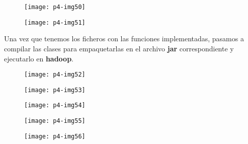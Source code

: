 \documentclass[10pt]{article}
\begin{document}
\begin{figure}[H]
	\begin{center}
 		\texttt{[image: p4-img50]}
	\end{center} 
\end{figure}

\begin{figure}[H]
	\begin{center}
 		\texttt{[image: p4-img51]}
	\end{center} 
\end{figure}

Una vez que tenemos los ficheros con las funciones implementadas, pasamos a compilar las clases para empaquetarlas en el archivo \textbf{jar} correspondiente y ejecutarlo en \textbf{hadoop}.\\

\begin{figure}[H]
	\begin{center}
 		\texttt{[image: p4-img52]}
	\end{center} 
\end{figure}

\begin{figure}[H]
	\begin{center}
 		\texttt{[image: p4-img53]}
	\end{center} 
\end{figure}

\begin{figure}[H]
	\begin{center}
 		\texttt{[image: p4-img54]}
	\end{center} 
\end{figure}

\begin{figure}[H]
	\begin{center}
 		\texttt{[image: p4-img55]}
	\end{center} 
\end{figure}

\begin{figure}[H]
	\begin{center}
 		\texttt{[image: p4-img56]}
	\end{center} 
\end{figure}
\end{document}
